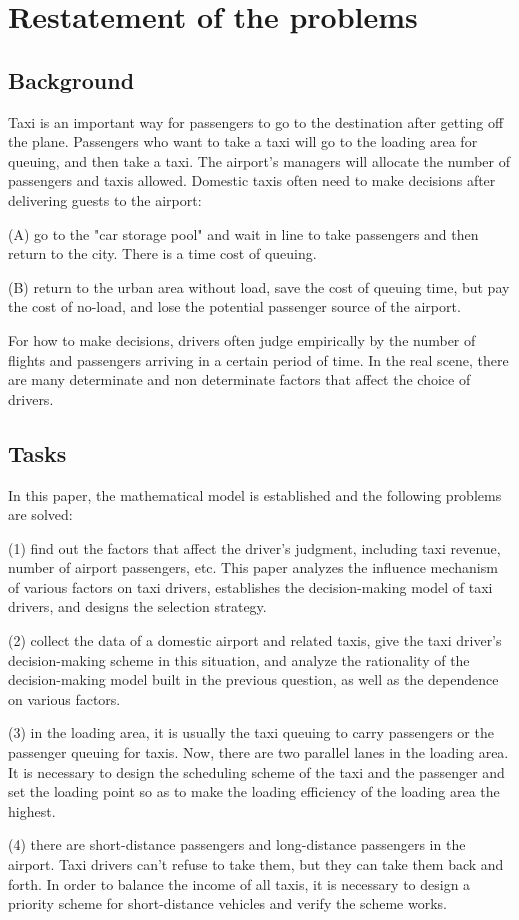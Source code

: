 \section{Restatement of the problems}
\subsection{Background}
\par Taxi is an important way for passengers to go to the destination after getting off the plane. Passengers who want to take a taxi will go to the loading area for queuing, and then take a taxi. The airport's managers will allocate the number of passengers and taxis allowed. Domestic taxis often need to make decisions after delivering guests to the airport:

(A) go to the "car storage pool" and wait in line to take passengers and then return to the city. There is a time cost of queuing.

(B) return to the urban area without load, save the cost of queuing time, but pay the cost of no-load, and lose the potential passenger source of the airport.

For how to make decisions, drivers often judge empirically by the number of flights and passengers arriving in a certain period of time. In the real scene, there are many determinate and non determinate factors that affect the choice of drivers.

\subsection{Tasks}
\par In this paper, the mathematical model is established and the following problems are solved:

(1) find out the factors that affect the driver's judgment, including taxi revenue, number of airport passengers, etc. This paper analyzes the influence mechanism of various factors on taxi drivers, establishes the decision-making model of taxi drivers, and designs the selection strategy.

(2) collect the data of a domestic airport and related taxis, give the taxi driver's decision-making scheme in this situation, and analyze the rationality of the decision-making model built in the previous question, as well as the dependence on various factors.

(3) in the loading area, it is usually the taxi queuing to carry passengers or the passenger queuing for taxis. Now, there are two parallel lanes in the loading area. It is necessary to design the scheduling scheme of the taxi and the passenger and set the loading point so as to make the loading efficiency of the loading area the highest.

(4) there are short-distance passengers and long-distance passengers in the airport. Taxi drivers can't refuse to take them, but they can take them back and forth. In order to balance the income of all taxis, it is necessary to design a priority scheme for short-distance vehicles and verify the scheme works.